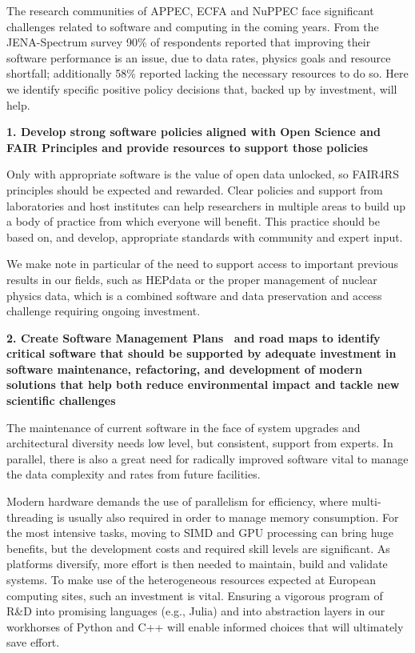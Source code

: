 The research communities of APPEC, ECFA and NuPPEC face significant challenges related to software and computing in the coming years. From the JENA-Spectrum survey 90\% of respondents reported that improving their software performance is an issue, due to data rates, physics goals and resource shortfall; additionally 58\% reported lacking the necessary resources to do so. Here we identify specific positive policy decisions that, backed up by investment, will help.

{\bf 1. Develop strong software policies aligned with Open Science and FAIR Principles and provide resources to support those policies}

Only with appropriate software is the value of open data unlocked, so FAIR4RS principles should be expected and rewarded. Clear policies and support from laboratories and host institutes can help researchers in multiple areas to build up a body of practice from which everyone will benefit. This practice should be based on, and develop, appropriate standards with community and expert input.

We make note in particular of the need to support access to important previous results in our fields, such as HEPdata or the proper management of nuclear physics data, which is a combined software and data preservation and access challenge requiring ongoing investment.

{\bf 2. Create Software Management Plans~\cite{SMPs} and road maps to identify critical software that should be supported by adequate investment in software maintenance, refactoring, and development of modern solutions that help both reduce environmental impact and tackle new scientific challenges}

The maintenance of current software in the face of system upgrades and architectural diversity needs low level, but consistent, support from experts. In parallel, there is also a great need for radically improved software vital to manage the data complexity and rates from future facilities.

Modern hardware demands the use of parallelism for efficiency, where multi-threading is usually also required in order to manage memory consumption. For the most intensive tasks, moving to SIMD and GPU processing can bring huge benefits, but the development costs and required skill levels are significant. As platforms diversify, more effort is then needed to maintain, build and validate systems. To make use of the heterogeneous resources expected at European computing sites, such an investment is vital. Ensuring a vigorous program of R\&D into promising languages (e.g., Julia) and into abstraction layers in our workhorses of Python and C++ will enable informed choices that will ultimately save effort.

